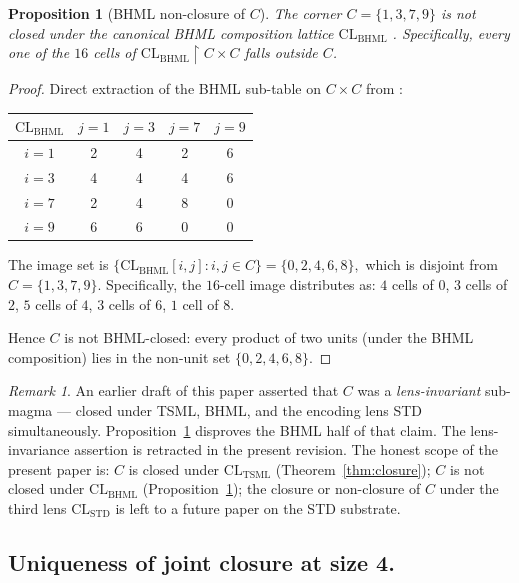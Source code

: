 \documentclass[11pt,reqno]{amsart}
\theoremstyle{plain}
\newtheorem{proposition}[theorem]{Proposition}
\theoremstyle{definition}
\theoremstyle{remark}
\newtheorem*{remark}{Remark}
\newcommand{\TSML}{\mathrm{TSML}}
\newcommand{\BHML}{\mathrm{BHML}}
\begin{document}
\begin{proposition}[BHML non-closure of $C$]\label{prop:bhml-fail}
The corner $C = \{1, 3, 7, 9\}$ is \emph{not} closed under the
canonical BHML composition lattice $\mathrm{CL}_\BHML$
\cite{SandersForcing}.  Specifically, every one of the $16$ cells of
$\mathrm{CL}_\BHML \restriction C \times C$ falls outside $C$.
\end{proposition}

\begin{proof}
Direct extraction of the BHML sub-table on $C \times C$ from
\cite[\S 6]{SandersForcing}:
\begin{center}
\begin{tabular}{c|cccc}
$\mathrm{CL}_\BHML$ & $j=1$ & $j=3$ & $j=7$ & $j=9$ \\
\hline
$i=1$ & 2 & 4 & 2 & 6 \\
$i=3$ & 4 & 4 & 4 & 6 \\
$i=7$ & 2 & 4 & 8 & 0 \\
$i=9$ & 6 & 6 & 0 & 0 \\
\end{tabular}
\end{center}
The image set is
\(
\{ \mathrm{CL}_\BHML[i, j] : i, j \in C \} = \{0, 2, 4, 6, 8\},
\)
which is disjoint from $C = \{1, 3, 7, 9\}$.  Specifically, the
$16$-cell image distributes as: $4$ cells of $0$, $3$ cells of $2$,
$5$ cells of $4$, $3$ cells of $6$, $1$ cell of $8$.

Hence $C$ is not BHML-closed: every product of two units (under the
BHML composition) lies in the non-unit set $\{0, 2, 4, 6, 8\}$.
\end{proof}

\begin{remark}\label{rem:lens-failure}
An earlier draft of this paper asserted that $C$ was a
\emph{lens-invariant} sub-magma --- closed under TSML, BHML, and the
encoding lens STD simultaneously.
Proposition~\ref{prop:bhml-fail} disproves the BHML half of that
claim.  The lens-invariance assertion is retracted in the present
revision.  The honest scope of the present paper is: $C$ is closed
under $\mathrm{CL}_\TSML$ (Theorem~\ref{thm:closure}); $C$ is not
closed under $\mathrm{CL}_\BHML$ (Proposition~\ref{prop:bhml-fail});
the closure or non-closure of $C$ under the third lens
$\mathrm{CL}_\mathrm{STD}$ is left to a future paper on the STD
substrate.
\end{remark}

\subsection{Uniqueness of joint closure at size 4.}
\end{document}
